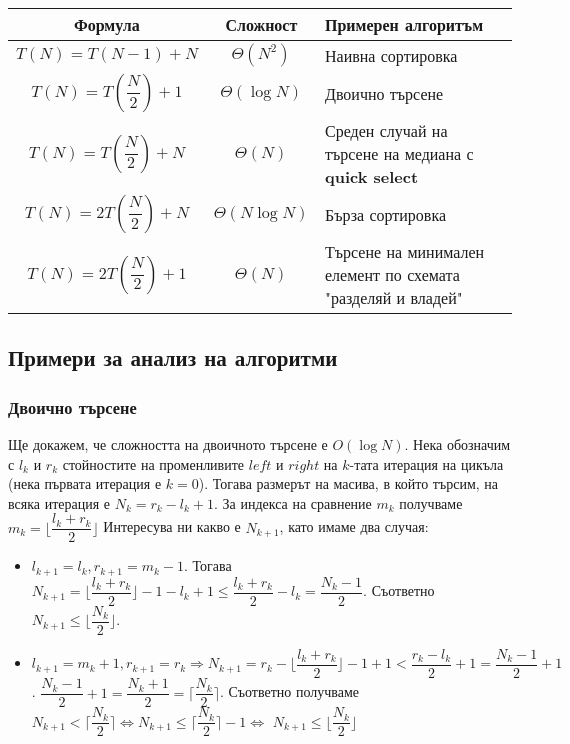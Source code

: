 \documentclass[fleqn,12pt]{article}
\begin{document}
\begin{center}
\begin{tabular}{|c|c|m{80mm}|}
    \hline
    Формула & Сложност & Примерен алгоритъм \\ 
    \hline
    $T(N) = T(N - 1) + N$ & $\Theta(N^2)$ & Наивна сортировка \\  
    \hline
    $T(N) = T\left(\dfrac{N}{2}\right) + 1$ & $\Theta(\log N)$ & Двоично търсене \\  
    \hline    
    $T(N) = T\left(\dfrac{N}{2}\right) + N$ & $\Theta(N)$ & Среден случай на търсене на медиана с \textbf{quick select} \\  
    \hline   
    $T(N) = 2T\left(\dfrac{N}{2}\right) + N$ & $\Theta(N \log N)$ & Бърза сортировка \\  
    \hline
    $T(N) = 2T\left(\dfrac{N}{2}\right) + 1$ & $\Theta(N)$ & Търсене на минимален елемент по схемата "разделяй и владей" \\  
    \hline     
\end{tabular}
\end{center}

\subsection{Примери за анализ на алгоритми}

\subsubsection{Двоично търсене}
Ще докажем, че сложността на двоичното търсене е $O(\log N)$.
Нека обозначим с $l_k$ и $r_k$ стойностите на променливите $left$ и $right$ на $k$-тата итерация на цикъла (нека първата итерация е $k = 0$).
Тогава размерът на масива, в който търсим, на всяка итерация е $N_k = r_k - l_k + 1$. За индекса на сравнение $m_k$ получваме
$m_k = \Big\lfloor\dfrac{l_k + r_k}{2}\Big\rfloor$ Интересува ни какво е $N_{k + 1}$, като имаме два случая:
\begin{itemize}
    \item $l_{k+1} = l_k, r_{k+1} = m_k - 1$. Тогава $N_{k+1} = \Big\lfloor\dfrac{l_k + r_k}{2}\Big\rfloor - 1 - l_k + 1 \leq \dfrac{l_k + r_k}{2} - l_k = \dfrac{N_k - 1}{2}$.
    Съответно $N_{k+1} \leq \Bigg\lfloor \dfrac{N_k}{2} \Bigg\rfloor$.
    \item $l_{k+1} = m_k + 1, r_{k+1} = r_k \Rightarrow N_{k+1} = r_k - \Big\lfloor\dfrac{l_k + r_k}{2}\Big\rfloor - 1 + 1 < \dfrac{r_k - l_k}{2} + 1 = \dfrac{N_k - 1}{2} + 1$. 
    $\dfrac{N_k - 1}{2} + 1 = \dfrac{N_k + 1}{2} = \Bigg\lceil \dfrac{N_k}{2} \Bigg\rceil$.
    Съответно получваме $N_{k+1} < \Bigg\lceil \dfrac{N_k}{2} \Bigg\rceil \Leftrightarrow N_{k+1} \leq \Bigg\lceil \dfrac{N_k}{2} \Bigg\rceil - 1 \Leftrightarrow $
    $N_{k+1} \leq \Bigg\lfloor \dfrac{N_k}{2} \Bigg\rfloor$
\end{itemize}
\end{document}
